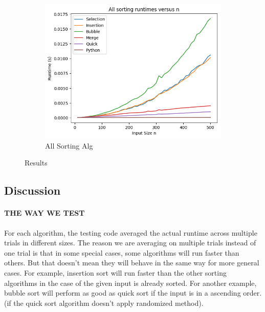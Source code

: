 \documentclass{article}
\begin{document}
\begin{figure}[H]
\begin{subfigure}{.3\textwidth}
		\includegraphics[width=\textwidth]{../results/normal/sorting.png}
		\caption{All Sorting Alg}
	\end{subfigure}
	\caption*{Results}
\end{figure}



\subsection*{Discussion}
\paragraph{THE WAY WE TEST}
For each algorithm, the testing code averaged the actual runtime across multiple trials in different sizes. The reason we are averaging on multiple trials instead of one trial is that in some special cases, some algorithms will run faster than others. But that doesn’t mean they will behave in the same way for more general cases. For example, insertion sort will run faster than the other sorting algorithms in the case of the given input is already sorted. For another example, bubble sort will perform as good as quick sort if the input is in a ascending order. (if the quick sort algorithm doesn’t apply randomized method).
\end{document}
